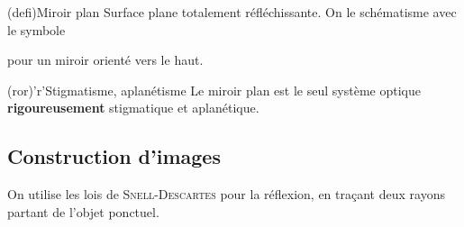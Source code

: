 \documentclass[../../main/main.tex]{subfiles}
\begin{document}
\begin{tcbraster}[raster columns=2, raster equal height=rows]
	\begin{tcb*}[label=def:mir](defi){Miroir plan}
		Surface plane totalement réfléchissante. On le schématisme avec le symbole
		\begin{center}
		\end{center}
		pour un miroir orienté vers le haut.
	\end{tcb*}
	\begin{tcn}[label=mirstig](ror)'r'{Stigmatisme, aplanétisme}
		Le miroir plan est le seul système optique \textbf{rigoureusement}
		stigmatique et aplanétique.
	\end{tcn}
\end{tcbraster}

\subsection{Construction d'images}
On utilise les lois de \textsc{Snell-Descartes} pour la réflexion, en traçant
deux rayons partant de l'objet ponctuel.
\end{document}
